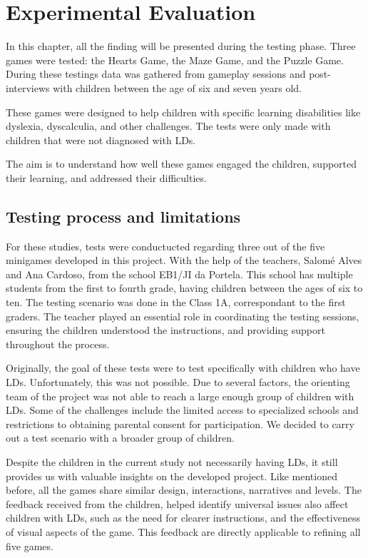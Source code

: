 \chapter{Experimental Evaluation}
\label{cha:results}

In this chapter, all the finding will be presented during the testing phase. Three games were tested: the Hearts Game, the Maze Game, and the Puzzle Game. During these testings data was gathered from gameplay sessions and post-interviews with children between the age of six and seven years old.

These games were designed to help children with specific learning disabilities like dyslexia, dyscalculia, and other challenges. The tests were only made with children that were not diagnosed with LDs.

The aim is to understand how well these games engaged the children, supported their learning, and addressed their difficulties.

\newpage

\section{Testing process and limitations}

For these studies, tests were conductucted regarding three out of the five minigames developed in this project.
With the help of the teachers, Salomé Alves and Ana Cardoso, from the school EB1/JI da Portela. This school has multiple students from the first to fourth grade, having children between the ages of six to ten.
The testing scenario was done in the Class 1A, correspondant to the first graders.
The teacher played an essential role in coordinating the testing sessions, ensuring the children understood the instructions, and providing support throughout the process.

Originally, the goal of these tests were to test specifically with children who have LDs. Unfortunately, this was not possible. Due to several factors, the orienting team of the project was not able to reach a large enough group of children with LDs. Some of the challenges include the limited access to specialized schools and restrictions to obtaining parental consent for participation. We decided to carry out a test scenario with a broader group of children.

Despite the children in the current study not necessarily having LDs, it still provides us with valuable insights on the developed project. Like mentioned before, all the games share similar design, interactions, narratives and levels. The feedback received from the children, helped identify universal issues also affect children with LDs, such as the need for clearer instructions, and the effectiveness of visual aspects of the game. This feedback are directly applicable to refining all five games.

